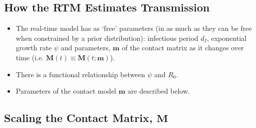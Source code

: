 \documentclass{article}
\renewcommand{\vec}[1]{\boldsymbol{{#1}}}
\begin{document}
\subsection*{How the RTM Estimates Transmission}
\begin{itemize}
\item The real-time model has as `free' parameters (in as much as they can be free when constrained by a prior distribution): infectious period $d_I$, exponential growth rate $\psi$ and parameters, $\vec{m}$ of the contact matrix as it changes over time (i.e. $\vec{M}(t) \equiv \vec{M}(t;\vec{m})$).
\item There is a functional relationship between $\psi$ and $R_0$.
\item Parameters of the contact model $\vec{m}$ are described below.
\end{itemize}

\subsection*{Scaling the Contact Matrix, $\vec{M}$}
\end{document}
